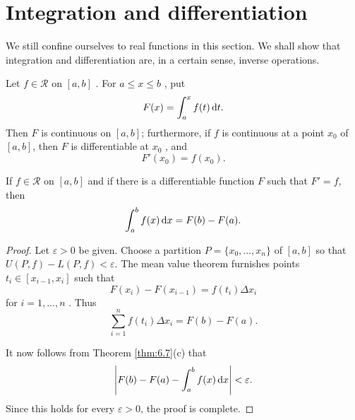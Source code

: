 \section{Integration and differentiation}

We still confine ourselves to real functions in this section. 
We shall show that integration and differentiation are, in a certain sense, inverse operations.

\begin{thm}
    \label{thm:6.20}
    Let $f \in \mathscr{R}$ on $[a,b]$ .
    For $a \leq x \leq b$ , put
    \begin{equation*}
        F(x) = \int_{a}^{x} f(t) \d t.
    \end{equation*}
    Then $F$ is continuous on $[a, b ]$;
    furthermore, if $f$ is continuous at a point $x_0$ of $[a, b ]$, 
    then $F$ is differentiable at $x_0$ , and
    \begin{equation*}
        F'(x_0) = f(x_0).
    \end{equation*}
\end{thm}

\begin{thm}
    \label{thm:6.21}
    If $f \in \mathscr{R}$ on $[a,b]$ 
    and if there is a differentiable function $F$
    such that $F' = f$, then
    \begin{equation*}
        \int_{a}^{b} f(x) \d x = F(b) - F(a).
    \end{equation*}
\end{thm}
\begin{proof}
    Let $\varepsilon > 0$ be given.
    Choose a partition $P = \{x_0,...,x_n\}$ of $[a,b]$ 
    so that $U(P,f) - L(P,f)<\varepsilon$.
    The mean value theorem furnishes points $t_i \in [x_{i-1}, x_i]$
    such that
    \begin{equation*}
        F(x_i) - F(x_{i-1}) = f(t_i) \Delta x_i
    \end{equation*}
    for $i = 1,...,n$ . Thus 
    \begin{equation*}
        \sum_{i=1}^{n} f(t_i) \Delta x_i = F(b) - F(a).
    \end{equation*}

    It now follows from Theorem \ref{thm:6.7}(c) that
    \begin{equation*}
        \left| F(b) - F(a) - \int_{a}^{b} f(x) \d x \right|  < \varepsilon.
    \end{equation*}
    Since this holds for every $\varepsilon > 0$,
    the proof is complete.
\end{proof}

